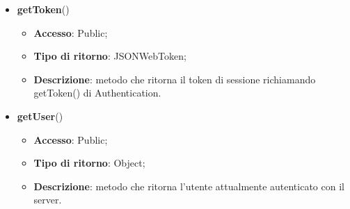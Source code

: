 {{{\begin{itemize}
				\begin{itemize}
					\item \textbf{Accesso}: Public;
					\item \textbf{Tipo di ritorno}: Void;
					\item \textbf{Descrizione}: metodo che, attraverso l'oggetto formData contenente le credenziali di accesso e la nuova password, effettua il cambio della password di un utente richiamando il metodo changepassword() di Authentication. Se l'operazione ha successo viene invocato success altrimenti error.
				\end{itemize}
				\item \textbf{getToken}()
				\begin{itemize}
					\item \textbf{Accesso}: Public;
					\item \textbf{Tipo di ritorno}: JSONWebToken;
					\item \textbf{Descrizione}: metodo che ritorna il token di sessione richiamando getToken() di Authentication.
				\end{itemize}
				\item \textbf{getUser}()
				\begin{itemize}
					\item \textbf{Accesso}: Public;
					\item \textbf{Tipo di ritorno}: Object;
					\item \textbf{Descrizione}: metodo che ritorna l'utente attualmente autenticato con il server.
				\end{itemize}
			\end{itemize} 
		}
}}
